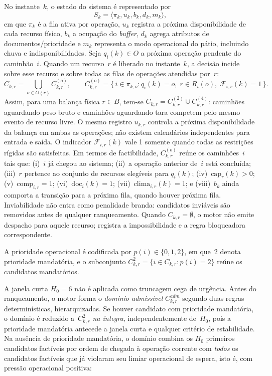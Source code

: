 \documentclass[
  12pt,
  oneside,
  a4paper,
  sumario=tradicional,
  brazil
]{abntex2}
\begin{document}
No instante~$k$, o estado do sistema \'e representado por
\[
S_k = \langle \pi_k, u_k, b_k, d_k, m_k \rangle,
\]
em que $\pi_k$ \'e a fila ativa por opera\c{c}\~ao, $u_k$ registra a pr\'oxima disponibilidade de cada recurso f\'isico, $b_k$ a ocupa\c{c}\~ao do \textit{buffer}, $d_k$ agrega atributos de documentos/prioridade e $m_k$ representa o modo operacional do p\'atio, incluindo chuva e indisponibilidades. Seja $q_i(k) \in O$ a pr\'oxima opera\c{c}\~ao pendente do caminh\~ao~$i$. Quando um recurso~$r$ \'e liberado no instante~$k$, a decis\~ao incide sobre esse recurso e sobre todas as filas de opera\c{c}\~oes atendidas por~$r$:
\[
C_{k,r} = \bigcup_{o \in O(r)} C^{(o)}_{k,r},
\qquad
C^{(o)}_{k,r} =
\{\,i \in \pi_{k,o}: q_i(k)=o,\; r \in R_i(o),\; \mathcal{F}_{i,r}(k)=1\,\}.
\]
Assim, para uma balan\c{c}a f\'isica $r \in B$, tem-se $C_{k,r}=C^{(2)}_{k,r}\cup C^{(4)}_{k,r}$: caminh\~oes aguardando peso bruto e caminh\~oes aguardando tara competem pelo mesmo evento de recurso livre. O mesmo registro $u_{k,r}$ controla a pr\'oxima disponibilidade da balan\c{c}a em ambas as opera\c{c}\~oes; n\~ao existem calend\'arios independentes para entrada e sa\'ida. O indicador $\mathcal{F}_{i,r}(k)$ vale 1 somente quando todas as restri\c{c}\~oes r\'igidas s\~ao satisfeitas. Em termos de factibilidade, $C^{(o)}_{k,r}$ re\'une os caminh\~oes~$i$ tais que: (i)~$i$ j\'a chegou ao sistema; (ii)~a opera\c{c}\~ao anterior de~$i$ est\'a conclu\'ida; (iii)~$r$ pertence ao conjunto de recursos eleg\'iveis para $q_i(k)$; (iv)~$\mathrm{cap}_r(k) > 0$; (v)~$\mathrm{comp}_{i,r} = 1$; (vi)~$\mathrm{doc}_i(k) = 1$; (vii)~$\mathrm{clima}_{i,r}(k) = 1$; e (viii)~$b_k$ ainda comporta a transi\c{c}\~ao para a pr\'oxima fila, quando houver pr\'oxima fila. Inviabilidade n\~ao entra como penalidade branda: candidatos invi\'aveis s\~ao removidos antes de qualquer ranqueamento. Quando $C_{k,r} = \emptyset$, o motor n\~ao emite despacho para aquele recurso; registra a impossibilidade e a regra bloqueadora correspondente.

A prioridade operacional \'e codificada por $p(i) \in \{0, 1, 2\}$, em que~$2$ denota prioridade mandat\'oria, e o subconjunto $C^{2}_{k,r} = \{ i \in C_{k,r} : p(i) = 2 \}$ re\'une os candidatos mandat\'orios.

A janela curta $H_0 = 6$ n\~ao \'e aplicada como truncagem cega de urg\^encia. Antes do ranqueamento, o motor forma o \emph{dom\'inio admiss\'ivel} $C^{adm}_{k,r}$ segundo duas regras determin\'isticas, hierarquizadas. Se houver candidato com prioridade mandat\'oria, o dom\'inio \'e reduzido a~$C^{2}_{k,r}$ \emph{na \'integra}, independentemente de~$H_0$, pois a prioridade mandat\'oria antecede a janela curta e qualquer crit\'erio de estabilidade. Na aus\^encia de prioridade mandat\'oria, o dom\'inio combina os $H_0$ primeiros candidatos fact\'iveis por ordem de chegada \`a opera\c{c}\~ao corrente com \emph{todos} os candidatos fact\'iveis que j\'a violaram seu limiar operacional de espera, isto \'e, com press\~ao operacional positiva:
\end{document}
